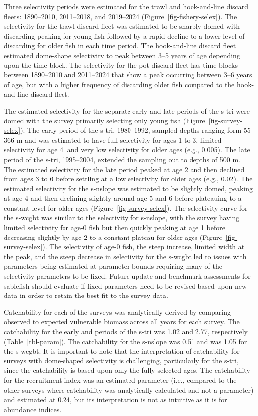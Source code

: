 \documentclass[
  english,
]{article}
\begin{document}
Three selectivity periods were estimated for the trawl and hook-and-line
discard fleets: 1890--2010, 2011--2018, and 2019--2024
(Figure~\ref{fig-fishery-selex}). The selectivity for the trawl discard
fleet was estimated to be sharply domed with discarding peaking for
young fish followed by a rapid decline to a lower level of discarding
for older fish in each time period. The hook-and-line discard fleet
estimated dome-shape selectivity to peak between 3--5 years of age
depending upon the time block. The selectivity for the pot discard fleet
has time blocks between 1890--2010 and 2011--2024 that show a peak
occurring between 3--6 years of age, but with a higher frequency of
discarding older fish compared to the hook-and-line discard fleet.

The estimated selectivity for the separate early and late periods of the
\gls{s-tri} were domed with the survey primarily selecting only young
fish (Figure~\ref{fig-survey-selex}). The early period of the
\gls{s-tri}, 1980--1992, sampled depths ranging form 55--366 m and was
estimated to have full selectivity for ages 1 to 3, limited selectivity
for age 4, and very low selectivity for older ages (e.g., 0.005). The
late period of the \gls{s-tri}, 1995--2004, extended the sampling out to
depths of 500 m. The estimated selectivity for the late period peaked at
age 2 and then declined from ages 3 to 6 before settling at a low
selectivity for older ages (e.g., 0.02). The estimated selectivity for
the \gls{s-nslope} was estimated to be slightly domed, peaking at age 4
and then declining slightly around age 5 and 6 before plateauing to a
constant level for older ages (Figure~\ref{fig-survey-selex}). The
selectivity curve for the \gls{s-wcgbt} was similar to the selectivity
for \gls{s-nslope}, with the survey having limited selectivity for age-0
fish but then quickly peaking at age 1 before decreasing slightly by age
2 to a constant plateau for older ages (Figure~\ref{fig-survey-selex}).
The selectivity of age-0 fish, the steep increase, limited width at the
peak, and the steep decrease in selectivity for the \gls{s-wcgbt} led to
issues with parameters being estimated at parameter bounds requiring
many of the selectivity parameters to be fixed. Future update and
benchmark assessments for sablefish should evaluate if fixed parameters
need to be revised based upon new data in order to retain the best fit
to the survey data.

Catchability for each of the surveys was analytically derived by
comparing observed to expected vulnerable biomass across all years for
each survey. The catchability for the early and periods of the
\gls{s-tri} was 1.02 and 2.77, respectively (Table~\ref{tbl-param}). The
catchability for the \gls{s-nslope} was 0.51 and was 1.05 for the
\gls{s-wcgbt}. It is important to note that the interpretation of
catchability for surveys with dome-shaped selectivity is challenging,
particularly for the \gls{s-tri}, since the catchability is based upon
only the fully selected ages. The catchability for the recruitment index
was an estimated parameter (i.e., compared to the other surveys where
catchability was analytically calculated and not a parameter) and
estimated at 0.24, but its interpretation is not as intuitive as it is
for abundance indices.
\end{document}
